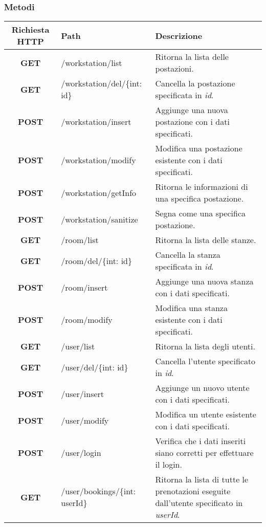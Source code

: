 \subsubsection{Metodi}
\begin{center}
	\begin{longtable}{|c|p{5cm}|p{5cm}|}
		\hline
		\rowcolor{lighter-grayer}
		\textbf{Richiesta HTTP} & \textbf{Path} & \textbf{Descrizione}\\		
		\hline
		\endfirsthead
		\textbf{GET} & /workstation/list & Ritorna la lista delle postazioni.\\
		\hline
		\textbf{GET} & /workstation/del/\{int: id\} & Cancella la postazione specificata in \textit{id}.\\
		\hline
		\textbf{POST} & /workstation/insert & Aggiunge una nuova postazione con i dati specificati.\\
		\hline
		\textbf{POST} & /workstation/modify & Modifica una postazione esistente con i dati specificati.\\
		\hline
		\textbf{POST} & /workstation/getInfo & Ritorna le informazioni di una specifica postazione.\\
		\hline
		\textbf{POST} & /workstation/sanitize & Segna come \glock{sanificata} una specifica postazione.\\
		\hline
		\textbf{GET} & /room/list & Ritorna la lista delle stanze.\\
		\hline
		\textbf{GET} & /room/del/\{int: id\} & Cancella la stanza specificata in \textit{id}.\\
		\hline
		\textbf{POST} & /room/insert & Aggiunge una nuova stanza con i dati specificati.\\
		\hline
		\textbf{POST} & /room/modify & Modifica una stanza esistente con i dati specificati.\\
		\hline
		\textbf{GET} & /user/list & Ritorna la lista degli utenti.\\
		\hline
		\textbf{GET} & /user/del/\{int: id\} & Cancella l'utente specificato in \textit{id}.\\
		\hline
		\textbf{POST} & /user/insert & Aggiunge un nuovo utente con i dati specificati.\\
		\hline
		\textbf{POST} & /user/modify & Modifica un utente esistente con i dati specificati.\\
		\hline
		\textbf{POST} & /user/login & Verifica che i dati inseriti siano corretti per effettuare il login.\\
		\hline
		\textbf{GET} & /user/bookings/\{int: userId\} & Ritorna la lista di tutte le prenotazioni eseguite dall'utente specificato in \textit{userId}.\\
		\hline
	\end{longtable}
\end{center}
